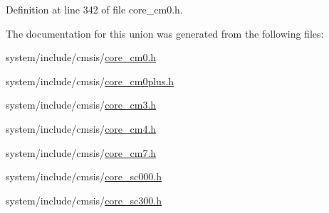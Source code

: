 Definition at line 342 of file core\+\_\+cm0.\+h.



The documentation for this union was generated from the following files\+:\begin{DoxyCompactItemize}
\item 
system/include/cmsis/\hyperlink{core__cm0_8h}{core\+\_\+cm0.\+h}\item 
system/include/cmsis/\hyperlink{core__cm0plus_8h}{core\+\_\+cm0plus.\+h}\item 
system/include/cmsis/\hyperlink{core__cm3_8h}{core\+\_\+cm3.\+h}\item 
system/include/cmsis/\hyperlink{core__cm4_8h}{core\+\_\+cm4.\+h}\item 
system/include/cmsis/\hyperlink{core__cm7_8h}{core\+\_\+cm7.\+h}\item 
system/include/cmsis/\hyperlink{core__sc000_8h}{core\+\_\+sc000.\+h}\item 
system/include/cmsis/\hyperlink{core__sc300_8h}{core\+\_\+sc300.\+h}\end{DoxyCompactItemize}
